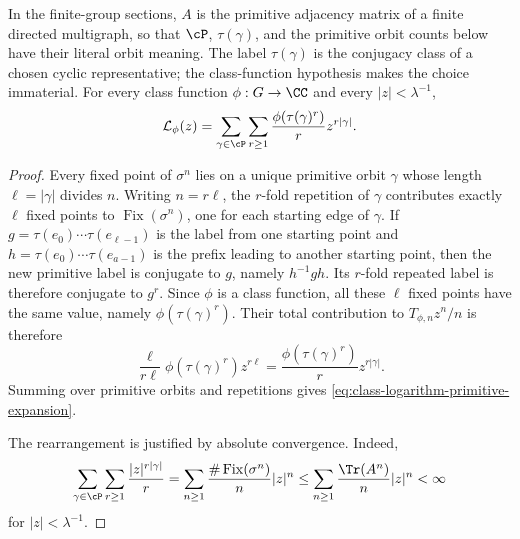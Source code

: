 \begin{lemma}
  \label{lem:class-logarithm-primitive-expansion}
  In the finite-group sections, \(A\) is the primitive adjacency matrix of a
  finite directed multigraph, so that \(\cP\), \(\tau(\gamma)\), and the
  primitive orbit counts below have their literal orbit meaning.  The label
  \(\tau(\gamma)\) is the conjugacy class of a chosen cyclic representative;
  the class-function hypothesis makes the choice immaterial.
  For every class function \(\phi:G\to\CC\) and every
  \(|z|<\lambda^{-1}\),
  \begin{equation}\label{eq:class-logarithm-primitive-expansion}
    \mathcal L_\phi(z)
    =
    \sum_{\gamma\in\cP}\sum_{r\ge 1}
      \frac{\phi(\tau(\gamma)^r)}{r}z^{r|\gamma|}.
  \end{equation}
\end{lemma}

\begin{proof}
  Every fixed point of \(\sigma^n\) lies on a unique primitive orbit
  \(\gamma\) whose length \(\ell=|\gamma|\) divides \(n\). Writing
  \(n=r\ell\), the \(r\)-fold repetition of \(\gamma\) contributes
  exactly \(\ell\) fixed points to \(\operatorname{Fix}(\sigma^n)\), one
  for each starting edge of \(\gamma\). If
  \(g=\tau(e_0)\cdots\tau(e_{\ell-1})\) is the label from one starting
  point and \(h=\tau(e_0)\cdots\tau(e_{a-1})\) is the prefix leading to
  another starting point, then the new primitive label is conjugate to
  \(g\), namely \(h^{-1}gh\). Its \(r\)-fold repeated label is therefore
  conjugate to \(g^r\). Since \(\phi\) is a class function, all these
  \(\ell\) fixed points have the same value, namely
  \(\phi(\tau(\gamma)^r)\). Their total contribution to
  \(T_{\phi,n}z^n/n\) is therefore
  \[
    \frac{\ell}{r\ell}\phi(\tau(\gamma)^r)z^{r\ell}
    =
    \frac{\phi(\tau(\gamma)^r)}{r}z^{r|\gamma|}.
  \]
  Summing over primitive orbits and repetitions gives
  \eqref{eq:class-logarithm-primitive-expansion}.

  The rearrangement is justified by absolute convergence. Indeed,
  \[
    \sum_{\gamma\in\cP}\sum_{r\ge 1}
      \frac{|z|^{r|\gamma|}}{r}
    =
    \sum_{n\ge 1}\frac{\#\operatorname{Fix}(\sigma^n)}{n}|z|^n
    \le
    \sum_{n\ge 1}\frac{\Tr(A^n)}{n}|z|^n
    <\infty
  \]
  for \(|z|<\lambda^{-1}\).
\end{proof}

